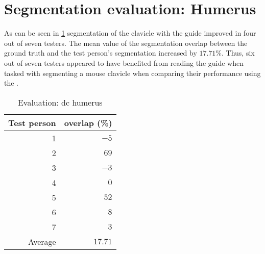 \section{Segmentation evaluation: Humerus}\label{s:seg-eval-humerus}
As can be seen in \cref{tab:humerus-overlap} segmentation of the clavicle with the guide improved in four out of seven testers.
The mean value of the segmentation overlap between the ground truth and the test person's segmentation increased by $17.71\%$.
Thus, six out of seven testers appeared to have benefited from reading the guide when tasked with segmenting a mouse 
clavicle when comparing their performance using the .
\begin{table}[ht]
	\begin{center}
		\begin{tabular}{r r}
			\textbf{Test person} & \textbf{overlap (\%)} \\
			\hline
			1                    & $-5$                  \\
			2                    & $69$                  \\
			3                    & $-3$                  \\
			4                    & $0$                   \\
			5                    & $52$                  \\
			6                    & $8$                   \\
			7                    & $3$                   \\
			\hline
			Average              & $17.71$               \\
		\end{tabular}
		\caption{Evaluation: \acrshort{dc} humerus}\label{tab:humerus-overlap}
	\end{center}
\end{table}

